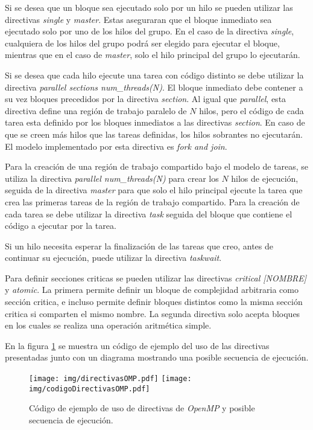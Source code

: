 Si se desea que un bloque sea ejecutado solo por un hilo se pueden utilizar las
directivas \emph{single} y \emph{master}. Estas aseguraran que el bloque
inmediato sea ejecutado solo por uno de los hilos del grupo. En el caso de la
directiva \emph{single}, cualquiera de los hilos del grupo podrá ser elegido
para ejecutar el bloque, mientras que en el caso de \emph{master}, solo el
hilo principal del grupo lo ejecutarán.

Si se desea que cada hilo ejecute una tarea con código distinto se debe utilizar
la directiva \emph{parallel sections num\_threads(N)}. El bloque inmediato debe
contener a su vez bloques precedidos por la directiva \emph{section}. Al igual
que \emph{parallel}, esta directiva define una región de trabajo paralelo de $N$
hilos, pero el código de cada tarea esta definido por los bloques inmediatos a
las directivas \emph{section}. En caso de que se creen más hilos que las tareas
definidas, los hilos sobrantes no ejecutarán. El modelo implementado por esta
directiva es \emph{fork and join}.

Para la creación de una región de trabajo compartido bajo el modelo de tareas, se
utiliza la directiva \emph{parallel num\_threads(N)} para crear los $N$ hilos de
ejecución, seguida de la directiva \emph{master} para que solo el hilo principal
ejecute la tarea que crea las primeras tareas de la región de trabajo
compartido. Para la creación de cada tarea se debe utilizar la directiva
\emph{task} seguida del bloque que contiene el código a ejecutar por la tarea.

Si un hilo necesita esperar la finalización de las tareas que creo, antes de
continuar su ejecución, puede utilizar la directiva \emph{taskwait}.

Para definir secciones criticas se pueden utilizar las directivas \emph{critical
[NOMBRE]} y \emph{atomic}. La primera permite definir un bloque de complejidad
arbitraria como sección critica, e incluso permite definir bloques distintos
como la misma sección critica si comparten el mismo nombre. La segunda directiva
solo acepta bloques en los cuales se realiza una operación aritmética simple.

En la figura \ref{directivas} se muestra un código de ejemplo del uso de las
directivas presentadas junto con un diagrama mostrando una posible secuencia
de ejecución.

\begin{figure}[!h]

	\centering

	\texttt{[image: img/directivasOMP.pdf]}
	\texttt{[image: img/codigoDirectivasOMP.pdf]}

	\caption{Código de ejemplo de uso de directivas de \emph{OpenMP} y
	posible secuencia de ejecución.}

	\label{directivas}

\end{figure}
